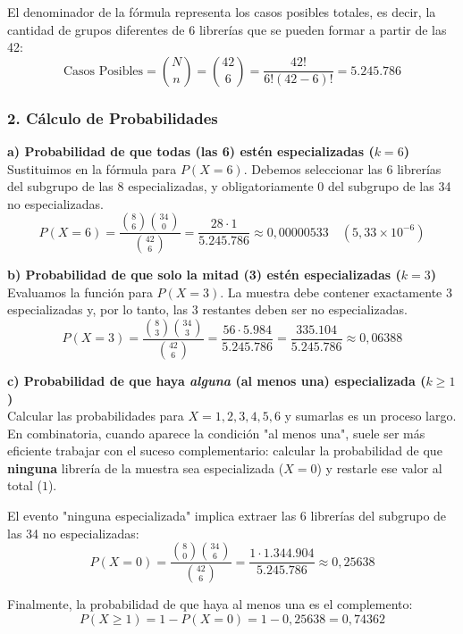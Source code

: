 \documentclass[11pt,a4paper]{article}
\begin{document}
El denominador de la fórmula representa los casos posibles totales, es decir, la cantidad de grupos diferentes de 6 librerías que se pueden formar a partir de las 42:
$$ \text{Casos Posibles} = \binom{N}{n} = \binom{42}{6} = \frac{42!}{6!(42-6)!} = 5.245.786 $$

\subsubsection*{2. Cálculo de Probabilidades}

\vspace{0.3cm}
\noindent \textbf{a) Probabilidad de que todas (las 6) estén especializadas ($k = 6$)} \\
Sustituimos en la fórmula para $P(X=6)$. Debemos seleccionar las 6 librerías del subgrupo de las 8 especializadas, y obligatoriamente 0 del subgrupo de las 34 no especializadas.
$$ P(X = 6) = \frac{\binom{8}{6} \binom{34}{0}}{\binom{42}{6}} = \frac{28 \cdot 1}{5.245.786} \approx 0,00000533 \quad (5,33 \times 10^{-6}) $$

\vspace{0.3cm}
\noindent \textbf{b) Probabilidad de que solo la mitad (3) estén especializadas ($k = 3$)} \\
Evaluamos la función para $P(X=3)$. La muestra debe contener exactamente 3 especializadas y, por lo tanto, las 3 restantes deben ser no especializadas.
$$ P(X = 3) = \frac{\binom{8}{3} \binom{34}{3}}{\binom{42}{6}} = \frac{56 \cdot 5.984}{5.245.786} = \frac{335.104}{5.245.786} \approx 0,06388 $$

\vspace{0.3cm}
\noindent \textbf{c) Probabilidad de que haya \textit{alguna} (al menos una) especializada ($k \ge 1$)} \\
Calcular las probabilidades para $X = 1, 2, 3, 4, 5, 6$ y sumarlas es un proceso largo. En combinatoria, cuando aparece la condición "al menos una", suele ser más eficiente trabajar con el suceso complementario: calcular la probabilidad de que \textbf{ninguna} librería de la muestra sea especializada ($X = 0$) y restarle ese valor al total ($1$).

El evento "ninguna especializada" implica extraer las 6 librerías del subgrupo de las 34 no especializadas:
$$ P(X = 0) = \frac{\binom{8}{0} \binom{34}{6}}{\binom{42}{6}} = \frac{1 \cdot 1.344.904}{5.245.786} \approx 0,25638 $$

Finalmente, la probabilidad de que haya al menos una es el complemento:
$$ P(X \ge 1) = 1 - P(X = 0) = 1 - 0,25638 = 0,74362 $$
\end{document}

